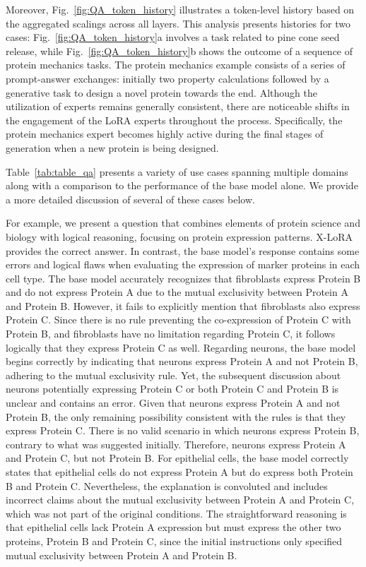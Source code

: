 Moreover, Fig.~\ref{fig:QA_token_history} illustrates a token-level history based on the aggregated scalings across all layers. This analysis presents histories for two cases: Fig.~\ref{fig:QA_token_history}a involves a task related to pine cone seed release, while Fig.~\ref{fig:QA_token_history}b shows the outcome of a sequence of protein mechanics tasks. The protein mechanics example consists of a series of prompt-answer exchanges: initially two property calculations followed by a generative task to design a novel protein towards the end. Although the utilization of experts remains generally consistent, there are noticeable shifts in the engagement of the LoRA experts throughout the process. Specifically, the protein mechanics expert becomes highly active during the final stages of generation when a new protein is being designed.

Table~\ref{tab:table_qa} presents a variety of use cases spanning multiple domains along with a comparison to the performance of the base model alone. We provide a more detailed discussion of several of these cases below.

For example, we present a question that combines elements of protein science and biology with logical reasoning, focusing on protein expression patterns. X-LoRA provides the correct answer. In contrast, the base model's response contains some errors and logical flaws when evaluating the expression of marker proteins in each cell type. The base model accurately recognizes that fibroblasts express Protein B and do not express Protein A due to the mutual exclusivity between Protein A and Protein B. However, it fails to explicitly mention that fibroblasts also express Protein C. Since there is no rule preventing the co-expression of Protein C with Protein B, and fibroblasts have no limitation regarding Protein C, it follows logically that they express Protein C as well. Regarding neurons, the base model begins correctly by indicating that neurons express Protein A and not Protein B, adhering to the mutual exclusivity rule. Yet, the subsequent discussion about neurons potentially expressing Protein C or both Protein C and Protein B is unclear and contains an error. Given that neurons express Protein A and not Protein B, the only remaining possibility consistent with the rules is that they express Protein C. There is no valid scenario in which neurons express Protein B, contrary to what was suggested initially. Therefore, neurons express Protein A and Protein C, but not Protein B. For epithelial cells, the base model correctly states that epithelial cells do not express Protein A but do express both Protein B and Protein C. Nevertheless, the explanation is convoluted and includes incorrect claims about the mutual exclusivity between Protein A and Protein C, which was not part of the original conditions. The straightforward reasoning is that epithelial cells lack Protein A expression but must express the other two proteins, Protein B and Protein C, since the initial instructions only specified mutual exclusivity between Protein A and Protein B.

